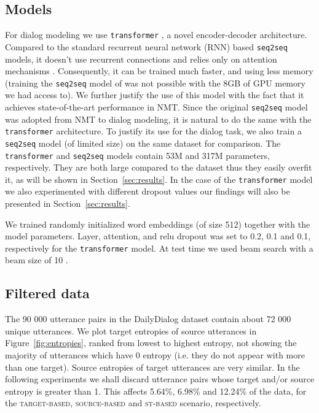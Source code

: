\documentclass[11pt,a4paper]{article}
\begin{document}
\subsection{Models}
For dialog modeling we use \texttt{transformer} \cite{Vaswani:2017}, a novel
encoder-decoder architecture. Compared to the standard recurrent neural
network (RNN) based \texttt{seq2seq} models, it doesn't use recurrent connections
and relies only on attention mechanisms \cite{Bahdanau:2015}. Consequently, it can
be trained much faster, and using less memory (training the
\texttt{seq2seq}
model of \cite{Vinyals:2015d} was not possible with the 8GB of GPU
memory we had access to). We further justify the use of this model with the fact that it achieves
state-of-the-art performance in NMT. Since the original \texttt{seq2seq} model was
adopted from NMT \cite{Cho:2014} to dialog modeling,
it is natural to do the same with the \texttt{transformer} architecture.
To justify its use for the dialog task, we also train a
\texttt{seq2seq} model (of limited size) on the same dataset for comparison.
The \texttt{transformer} and \texttt{seq2seq} models contain 53M and 317M
parameters, respectively. They are both large compared to the dataset thus
they easily overfit it, as will be shown in Section~\ref{sec:results}.
In the case of the \texttt{transformer} model we also experimented with different
dropout \cite{Srivastava:2014a} values our findings will also be
presented in Section~\ref{sec:results}.

We trained randomly initialized word embeddings (of size 512) together with the model parameters. Layer, attention, and relu dropout was set to 0.2, 0.1 and 0.1, respectively for the \texttt{transformer} model. At test time we used beam search with a beam size of 10 \cite{Graves:2012b}.

\subsection{Filtered data}
The 90 000 utterance pairs in the DailyDialog dataset contain about 72
000 unique utterances. We plot target entropies of source utterances in
Figure~\ref{fig:entropies}, ranked from lowest to highest entropy, not showing the majority of utterances which have 0 entropy (i.e. they do not appear with more than one target). Source entropies of target utterances are very similar. In the following
experiments we shall discard utterance pairs whose target and/or source entropy is greater
than 1. This affects 5.64\%, 6.98\% and 12.24\% of the data, for the \textsc{target-based}, \textsc{source-based} and \textsc{st-based} scenario, respectively.
\end{document}
